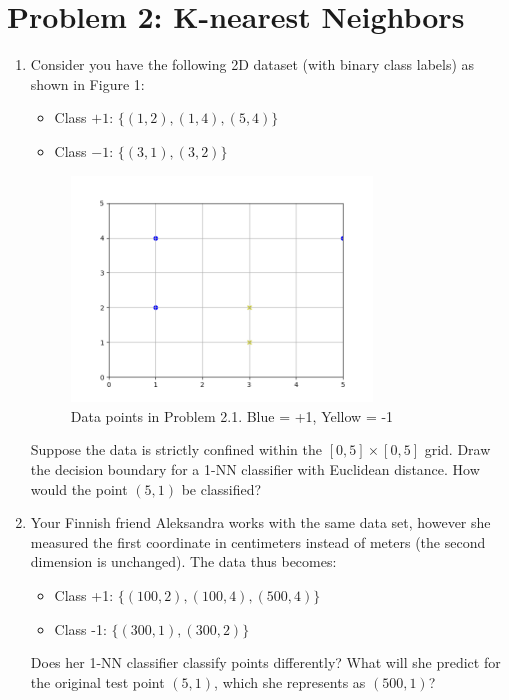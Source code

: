 \documentclass[11pt]{article}
\begin{document}
  \section*{Problem 2: K-nearest Neighbors}
  \begin{enumerate}
    \item Consider you have the following 2D dataset (with binary class labels) as shown in Figure 1:
    \begin{itemize}
      \item Class $+1$: $\{(1, 2), (1, 4), (5,4)\}$
      \item Class $-1$: $\{(3, 1), (3, 2)\}$
    \end{itemize}
	\begin{figure}[h!]
		\includegraphics[width=8cm]{Graph1.png}
		\centering
		\caption{Data points in Problem 2.1. Blue = +1, Yellow = -1}
	\end{figure}
    Suppose the data is strictly confined within the $[0, 5] \times [0, 5]$ grid. Draw the decision boundary for a 1-NN classifier with Euclidean distance.  How would the point $(5,1)$ be classified?
    \item Your Finnish friend Aleksandra works with the same data set, however she measured the first coordinate in centimeters instead of meters (the second dimension is unchanged). The data thus becomes:
    \begin{itemize}
      \item Class +1: $\{(100, 2), (100, 4), (500,4)\}$
      \item Class -1: $\{(300, 1), (300, 2)\}$
    \end{itemize}
	Does her 1-NN classifier classify points differently? What will she predict for the original test point $(5,1)$, which she represents as $(500,1)$?
    


\end{enumerate}
\end{document}
